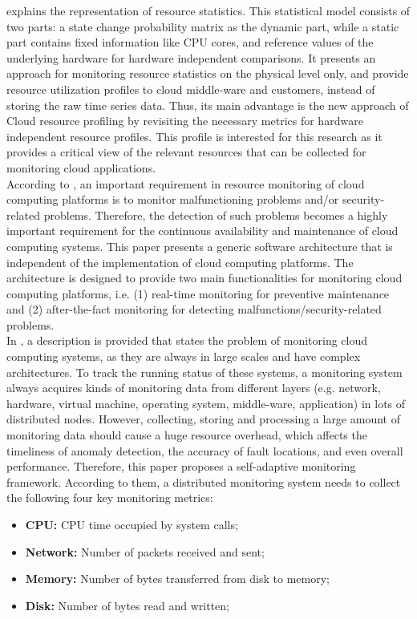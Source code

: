 \noindent
\cite{hauser2018reviewing} explains the representation of resource statistics. This statistical model consists of two parts: a state change probability matrix as the dynamic part, while a static part contains fixed information like CPU cores, and reference values of the underlying hardware for hardware independent comparisons. It presents an approach for monitoring resource statistics on the physical level only, and provide resource utilization profiles to cloud middle-ware and customers, instead of storing the raw time series data. Thus, its main advantage is the new approach of Cloud resource profiling by revisiting the necessary metrics for hardware independent resource profiles. This profile is interested for this research as it provides a critical view of the relevant resources that can be collected for monitoring cloud applications.\\

\noindent
According to \cite{aktas2018hybrid}, an important requirement in resource monitoring of cloud computing platforms is to monitor malfunctioning problems and/or security-related problems. Therefore, the detection of such problems becomes a highly important requirement for the continuous availability and maintenance of cloud computing systems. This paper presents a generic software architecture that is independent of the implementation of cloud computing platforms. The architecture is designed to provide two main functionalities for monitoring cloud computing platforms, i.e. (1) real-time monitoring for preventive maintenance and (2) after-the-fact monitoring for detecting malfunctions/security-related problems.\\

\noindent
In \cite{wang2018self}, a description is provided that states the problem of monitoring cloud computing systems, as they are always in large scales and have complex architectures. To track the running status of these systems, a monitoring system always acquires kinds of monitoring data from different layers (e.g. network, hardware, virtual machine, operating system, middle-ware, application) in lots of distributed nodes. However, collecting, storing and processing a large amount of monitoring data should cause a huge resource overhead, which affects the timeliness of anomaly detection, the accuracy of fault locations, and even overall performance. Therefore, this paper proposes a self-adaptive monitoring framework. According to them, a distributed monitoring system needs to collect the following four key monitoring metrics:
\begin{itemize}
    \item \textbf{CPU: }CPU time occupied by system calls;
    \item \textbf{Network: }Number of packets received and sent;
    \item \textbf{Memory: }Number of bytes transferred from disk to memory;
    \item \textbf{Disk: }Number of bytes read and written;
\end{itemize}

